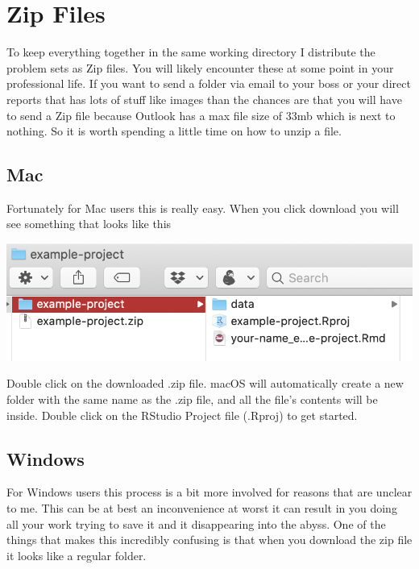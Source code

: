 \documentclass[
  letterpaper,
  DIV=11,
  numbers=noendperiod,
  oneside]{scrreprt}
\begin{document}
\hypertarget{zip-files}{%
\section{Zip Files}\label{zip-files}}

To keep everything together in the same working directory I distribute
the problem sets as Zip files. You will likely encounter these at some
point in your professional life. If you want to send a folder via email
to your boss or your direct reports that has lots of stuff like images
than the chances are that you will have to send a Zip file because
Outlook has a max file size of 33mb which is next to nothing. So it is
worth spending a little time on how to unzip a file.

\hypertarget{mac}{%
\subsection{Mac}\label{mac}}

Fortunately for Mac users this is really easy. When you click download
you will see something that looks like this

\includegraphics{pics/unzip-mac.png}

Double click on the downloaded .zip file. macOS will automatically
create a new folder with the same name as the .zip file, and all the
file's contents will be inside. Double click on the RStudio Project file
(.Rproj) to get started.

\hypertarget{windows}{%
\subsection{Windows}\label{windows}}

For Windows users this process is a bit more involved for reasons that
are unclear to me. This can be at best an inconvenience at worst it can
result in you doing all your work trying to save it and it disappearing
into the abyss. One of the things that makes this incredibly confusing
is that when you download the zip file it looks like a regular folder.
\end{document}
